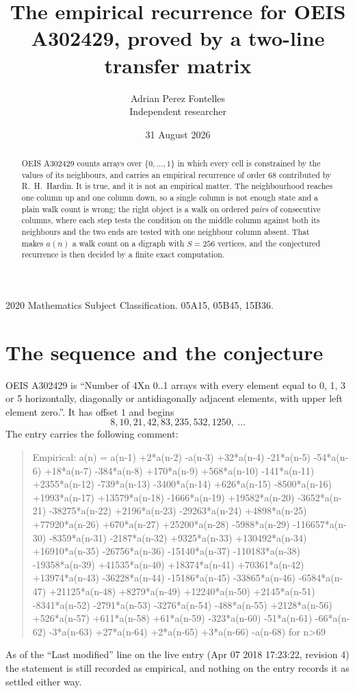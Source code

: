 \documentclass[11pt,a4paper]{article}
\title{The empirical recurrence for OEIS A302429, proved by a two-line transfer matrix}
\author{Adrian Perez Fontelles\\ \small Independent researcher}
\date{31 August 2026}
\theoremstyle{plain}
\theoremstyle{definition}
\begin{document}
\maketitle

\begin{abstract}
OEIS A302429 counts arrays over $\{0,\dots,1\}$ in which every cell is constrained by the
values of its neighbours, and carries an empirical recurrence of order $68$ contributed
by R.~H.~Hardin. It is true, and it is not an empirical matter. The neighbourhood reaches one
column up and one column down, so a single column is not enough state and a plain walk count
is wrong; the right object is a walk on ordered \emph{pairs} of consecutive columns, where
each step tests the condition on the middle column against both its neighbours and the two
ends are tested with one neighbour column absent. That makes $a(n)$ a walk count on a digraph
with $S=256$ vertices, and the conjectured recurrence is then decided by a finite exact
computation.
\end{abstract}

\noindent\small 2020 Mathematics Subject Classification. 05A15, 05B45, 15B36.\normalsize

\section{The sequence and the conjecture}

OEIS A302429 is ``Number of 4Xn 0..1 arrays with every element equal to 0, 1, 3 or 5 horizontally, diagonally or antidiagonally adjacent elements, with upper left element zero.''. It has offset $1$ and begins
\[
8, 10, 21, 42, 83, 235, 532, 1250,\ \dots
\]
The entry carries the following comment:
\begin{quote}\small
Empirical: a(n) = a(n-1) +2*a(n-2) -a(n-3) +32*a(n-4) -21*a(n-5) -54*a(n-6) +18*a(n-7) -384*a(n-8) +170*a(n-9) +568*a(n-10) -141*a(n-11) +2355*a(n-12) -739*a(n-13) -3400*a(n-14) +626*a(n-15) -8500*a(n-16) +1993*a(n-17) +13579*a(n-18) -1666*a(n-19) +19582*a(n-20) -3652*a(n-21) -38275*a(n-22) +2196*a(n-23) -29263*a(n-24) +4898*a(n-25) +77920*a(n-26) +670*a(n-27) +25200*a(n-28) -5988*a(n-29) -116657*a(n-30) -8359*a(n-31) -2187*a(n-32) +9325*a(n-33) +130492*a(n-34) +16910*a(n-35) -26756*a(n-36) -15140*a(n-37) -110183*a(n-38) -19358*a(n-39) +41535*a(n-40) +18374*a(n-41) +70361*a(n-42) +13974*a(n-43) -36228*a(n-44) -15186*a(n-45) -33865*a(n-46) -6584*a(n-47) +21125*a(n-48) +8279*a(n-49) +12240*a(n-50) +2145*a(n-51) -8341*a(n-52) -2791*a(n-53) -3276*a(n-54) -488*a(n-55) +2128*a(n-56) +526*a(n-57) +611*a(n-58) +61*a(n-59) -323*a(n-60) -51*a(n-61) -66*a(n-62) -3*a(n-63) +27*a(n-64) +2*a(n-65) +3*a(n-66) -a(n-68) for n>69
\end{quote}
As of the ``Last modified'' line on the live entry (Apr 07 2018 17:23:22, revision 4) the statement is
still recorded as empirical, and nothing on the entry records it as settled either way.
\end{document}
